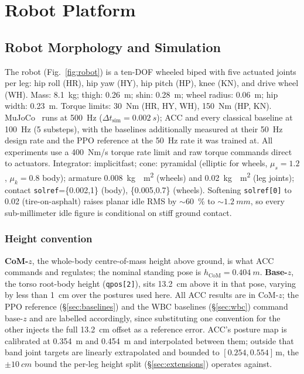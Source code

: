 \documentclass{jcd}
\begin{document}
\section{Robot Platform}

\subsection{Robot Morphology and Simulation}
The robot (Fig.~\ref{fig:robot}) is a ten-DOF wheeled biped with five actuated joints per leg: hip roll (HR), hip yaw (HY), hip pitch (HP), knee (KN), and drive wheel (WH). Mass: \SI{8.1}{kg}; thigh: \SI{0.26}{m}; shin: \SI{0.28}{m}; wheel radius: \SI{0.06}{m}; hip width: \SI{0.23}{m}. Torque limits: \SI{30}{Nm} (HR, HY, WH), \SI{150}{Nm} (HP, KN).
MuJoCo~\citep{mujoco} runs at \SI{500}{Hz} ($\Delta t_{\text{sim}}=\SI{0.002}{s}$); ACC and every classical baseline at \SI{100}{Hz} (\num{5} substeps), with the baselines additionally measured at their \SI{50}{Hz} design rate and the PPO reference at the \SI{50}{Hz} rate it was trained at. All experiments use a \SI{400}{Nm/s} torque rate limit and raw torque commands direct to actuators. Integrator: implicitfast; cone: pyramidal (elliptic for wheels, $\mu_s{=}1.2$, $\mu_k{=}0.8$ body); armature \SI{0.008}{kg{\cdot}m^2} (wheels) and \SI{0.02}{kg{\cdot}m^2} (leg joints); contact \texttt{solref}=\{0.002,1\} (body), \{0.005,0.7\} (wheels). Softening \texttt{solref[0]} to 0.02 (tire-on-asphalt) raises planar idle RMS by ${\sim}$\SI{60}{\percent} to ${\sim}\SI{1.2}{mm}$, so every sub-millimeter idle figure is conditional on stiff ground contact.

\subsubsection*{Height convention}
\label{sec:height_convention}
\textbf{CoM-$z$}, the whole-body centre-of-mass height above ground, is what ACC commands and regulates; the nominal standing pose is $h_{\text{CoM}}{=}\SI{0.404}{m}$. \textbf{Base-$z$}, the torso root-body height (\texttt{qpos[2]}), sits \SI{13.2}{cm} above it in that pose, varying by less than \SI{1}{cm} over the postures used here. All ACC results are in CoM-$z$; the PPO reference (\S\ref{sec:baselines}) and the WBC baselines (\S\ref{sec:wbc}) command base-$z$ and are labelled accordingly, since substituting one convention for the other injects the full \SI{13.2}{cm} offset as a reference error. ACC's posture map is calibrated at \SI{0.354}{m} and \SI{0.454}{m} and interpolated between them; outside that band joint targets are linearly extrapolated and bounded to $[0.254,0.554]\,$m, the $\pm\SI{10}{cm}$ bound the per-leg height split (\S\ref{sec:extensions}) operates against.
\end{document}
